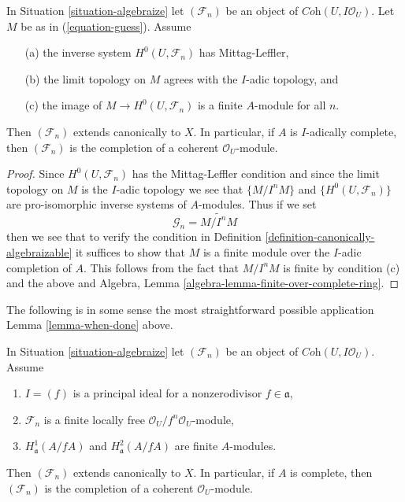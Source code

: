 \begin{lemma}
\label{lemma-when-done}
In Situation \ref{situation-algebraize} let $(\mathcal{F}_n)$ be an object
of $\textit{Coh}(U, I\mathcal{O}_U)$. Let $M$ be as in (\ref{equation-guess}).
Assume
\begin{enumerate}
\item[(a)] the inverse system $H^0(U, \mathcal{F}_n)$ has Mittag-Leffler,
\item[(b)] the limit topology on $M$ agrees with the $I$-adic topology, and
\item[(c)] the image of $M \to H^0(U, \mathcal{F}_n)$ is a finite $A$-module
for all $n$.
\end{enumerate}
Then $(\mathcal{F}_n)$ extends canonically to $X$.
In particular, if $A$ is $I$-adically complete, then
$(\mathcal{F}_n)$ is the completion of a coherent $\mathcal{O}_U$-module.
\end{lemma}

\begin{proof}
Since $H^0(U, \mathcal{F}_n)$ has the Mittag-Leffler condition
and since the limit topology on $M$ is the $I$-adic topology
we see that $\{M/I^nM\}$ and $\{H^0(U, \mathcal{F}_n)\}$
are pro-isomorphic inverse systems of $A$-modules.
Thus if we set
$$
\mathcal{G}_n = \widetilde{M/I^n M}
$$
then we see that to verify the condition in
Definition \ref{definition-canonically-algebraizable}
it suffices to show that $M$ is a finite module over the
$I$-adic completion of $A$. This follows from
the fact that $M/I^n M$ is finite by condition (c)
and the above and
Algebra, Lemma \ref{algebra-lemma-finite-over-complete-ring}.
\end{proof}

\noindent
The following is in some sense the most straightforward possible application
Lemma \ref{lemma-when-done} above.

\begin{lemma}
\label{lemma-algebraization-principal-variant}
In Situation \ref{situation-algebraize} let
$(\mathcal{F}_n)$ be an object of $\textit{Coh}(U, I\mathcal{O}_U)$.
Assume
\begin{enumerate}
\item $I = (f)$ is a principal ideal for a nonzerodivisor $f \in \mathfrak a$,
\item $\mathcal{F}_n$ is a finite locally free
$\mathcal{O}_U/f^n\mathcal{O}_U$-module,
\item $H^1_\mathfrak a(A/fA)$ and $H^2_\mathfrak a(A/fA)$
are finite $A$-modules.
\end{enumerate}
Then $(\mathcal{F}_n)$ extends canonically to $X$. In particular, if $A$
is complete, then $(\mathcal{F}_n)$ is the completion of a coherent
$\mathcal{O}_U$-module.
\end{lemma}

